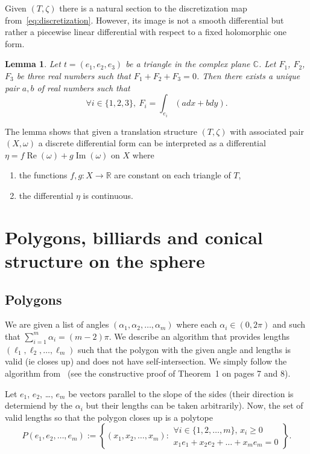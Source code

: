 \documentclass[a4paper,12pt]{article}
\def\bC{\mathbb{C}}
\def\bR{\mathbb{R}}
\def\Re{\operatorname{Re}}
\def\Im{\operatorname{Im}}
\newtheorem{lemma}[definition]{Lemma}
\begin{document}
Given $(T, \zeta)$ there is a natural section to the discretization map
from~\eqref{eq:discretization}. However, its image is not a smooth
differential but rather a piecewise linear differential with respect to a fixed
holomorphic one form.
\begin{lemma}
Let $t = (e_1, e_2, e_3)$ be a triangle in the complex plane $\bC$.
Let $F_1$, $F_2$, $F_3$ be three real numbers such that $F_1 + F_2 + F_3 = 0$.
Then there exists a unique pair $a,b$ of real numbers such that 
\[
\forall i \in \{1,2,3\},\ F_i = \int_{e_i} (a dx + b dy).
\]
\end{lemma}

The lemma shows that given a translation structure $(T, \zeta)$ with
associated pair $(X, \omega)$ a discrete differential form can
be interpreted as a differential
$\eta = f \Re(\omega) + g \Im(\omega)$ on $X$ where
\begin{enumerate}
\item the functions $f, g: X \to \bR$ are constant on each triangle of $T$,
\item the differential $\eta$ is continuous.
\end{enumerate}


\section{Polygons, billiards and conical structure on the sphere}

\subsection{Polygons}
We are given a list of angles $(\alpha_1, \alpha_2, \ldots, \alpha_m)$ where each
$\alpha_i \in (0,2\pi)$ and such that $\sum_{i=1}^m \alpha_i = (m-2) \pi$. We describe
an algorithm that provides lengths $(\ell_1, \ell_2, \ldots, \ell_m)$ such that
the polygon with the given angle and lengths is valid (ie closes up) and does not have
self-intersection. We simply follow the algorithm from~\cite{EfratFulekKobourovToth} (see the constructive proof of Theorem~1 on pages 7 and 8).

Let $e_1$, $e_2$, \ldots, $e_m$ be vectors parallel to the slope of the sides
(their direction is determiend by the $\alpha_i$ but their lengths can be taken
arbitrarily). Now, the set of valid lengths so that the polygon closes up is a
polytope
\[
P(e_1, e_2, \ldots, e_m) := \left\{(x_1, x_2, \ldots, x_m):
\begin{array}{l}
\forall i \in \{1,2,\ldots,m\},\, x_i \geq 0 \\
x_1 e_1 + x_2 e_2 + \ldots + x_m e_m = 0
\end{array}
\right\}.
\]
\end{document}
